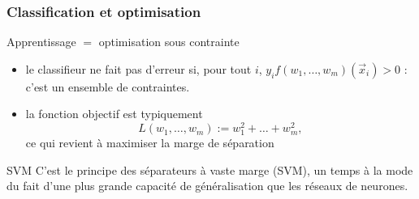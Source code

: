 \documentclass{beamer}
\newcommand{\Z}{{\ensuremath\mathbb{Z}}}
\begin{document}
\begin{frame}
  \frametitle{Classification et optimisation}

  \begin{block}{Apprentissage $=$ optimisation sous contrainte}

    \begin{itemize}
    \item le classifieur ne fait pas d'erreur si, pour tout $i$,
      $y_i f(w_1, \dots, w_m)(\vec{x}_i) > 0$ : c'est un ensemble
      de contraintes.
    \item la fonction objectif est typiquement 
      \[ L(w_1, \dots, w_m) := w_1^2 + \dots + w_m^2, \]
      ce qui revient à maximiser la marge de séparation
    \end{itemize}
  \end{block}

  \begin{block}{SVM}
    C'est le principe des séparateurs à vaste marge (SVM),
    un temps à la mode du fait d'une plus grande capacité de
    généralisation que les réseaux de neurones. 
  \end{block}
      
\end{frame}



  
\end{document}
